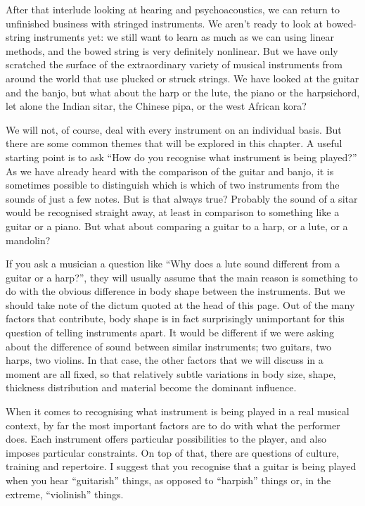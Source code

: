   After that interlude looking at hearing and psychoacoustics, we can return to 
  unfinished business with stringed instruments. We aren’t ready to look at 
  bowed-string instruments yet: we still want to learn as much as we can using 
  linear methods, and the bowed string is very definitely nonlinear. But we 
  have only scratched the surface of the extraordinary variety of musical 
  instruments from around the world that use plucked or struck strings. We have 
  looked at the guitar and the banjo, but what about the harp or the lute, the 
  piano or the harpsichord, let alone the Indian sitar, the Chinese pipa, or 
  the west African kora? 

  We will not, of course, deal with every instrument on an individual basis. 
  But there are some common themes that will be explored in this chapter. A 
  useful starting point is to ask “How do you recognise what instrument is 
  being played?” As we have already heard with the comparison of the guitar and 
  banjo, it is sometimes possible to distinguish which is which of two 
  instruments from the sounds of just a few notes. But is that always true? 
  Probably the sound of a sitar would be recognised straight away, at least in 
  comparison to something like a guitar or a piano. But what about comparing a 
  guitar to a harp, or a lute, or a mandolin? 

  If you ask a musician a question like “Why does a lute sound different from a 
  guitar or a harp?”, they will usually assume that the main reason is 
  something to do with the obvious difference in body shape between the 
  instruments. But we should take note of the dictum quoted at the head of this 
  page. Out of the many factors that contribute, body shape is in fact 
  surprisingly unimportant for this question of telling instruments apart. It 
  would be different if we were asking about the difference of sound between 
  similar instruments; two guitars, two harps, two violins. In that case, the 
  other factors that we will discuss in a moment are all fixed, so that 
  relatively subtle variations in body size, shape, thickness distribution and 
  material become the dominant influence. 

  When it comes to recognising what instrument is being played in a real 
  musical context, by far the most important factors are to do with what the 
  performer does. Each instrument offers particular possibilities to the 
  player, and also imposes particular constraints. On top of that, there are 
  questions of culture, training and repertoire. I suggest that you recognise 
  that a guitar is being played when you hear “guitarish” things, as opposed to 
  “harpish” things or, in the extreme, “violinish” things. 

